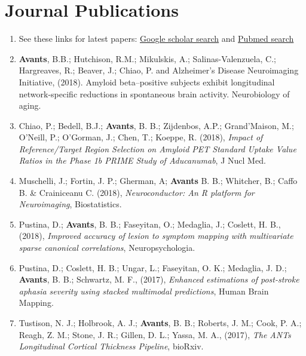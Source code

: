 \documentclass[11pt]{moderncv} %
\begin{document}
\section{Journal Publications} %
\begin{enumerate}
\item See these links for latest papers: \href{https://scholar.google.com/citations?hl=en&user=t4kkowgAAAAJ&view_op=list_works&sortby=pubdate}{Google scholar search} and \href{http://www.ncbi.nlm.nih.gov/pubmed?term=(\%22Avants\%20B\%22)\%20}{Pubmed  search}

\item \textbf{Avants}, B.B.; Hutchison, R.M.; Mikulskis, A.; Salinas-Valenzuela, C.; Hargreaves, R.; Beaver, J.; Chiao, P. and Alzheimer’s Disease Neuroimaging Initiative, (2018). Amyloid beta–positive subjects exhibit longitudinal network-specific reductions in spontaneous brain activity. Neurobiology of aging.


\item Chiao, P.; Bedell, B.J.; \textbf{Avants}, B. B.; Zijdenbos, A.P.; Grand'Maison, M.; O'Neill, P.; O'Gorman, J.; Chen, T.; Koeppe, R. (2018), \textit{Impact of Reference/Target Region Selection on Amyloid PET Standard Uptake Value Ratios in the Phase 1b PRIME Study of Aducanumab}, J Nucl Med.

\item Muschelli, J.; Fortin, J. P.; Gherman, A; \textbf{Avants} B. B.; Whitcher, B.; Caffo B. \& Crainiceanu C. (2018), \textit{Neuroconductor: An R platform for Neuroimaging}, Biostatistics.

\item Pustina, D.; \textbf{Avants}, B. B.; Faseyitan, O.; Medaglia, J.; Coslett, H. B., (2018), \textit{Improved accuracy of lesion to symptom mapping with multivariate sparse canonical correlations}, Neuropsychologia.

\item Pustina, D.; Coslett, H. B.; Ungar, L.; Faseyitan, O. K.; Medaglia, J. D.; \textbf{Avants}, B. B.; Schwartz, M. F., (2017), \textit{Enhanced estimations of post-stroke aphasia severity using stacked multimodal predictions}, Human Brain Mapping.

\item Tustison, N. J.; Holbrook, A. J.; \textbf{Avants}, B. B.; Roberts, J. M.; Cook, P. A.; Reagh, Z. M.; Stone, J. R.; Gillen, D. L.; Yassa, M. A., (2017), \textit{The ANTs Longitudinal Cortical Thickness Pipeline}, bioRxiv.


\end{enumerate}
\end{document}
